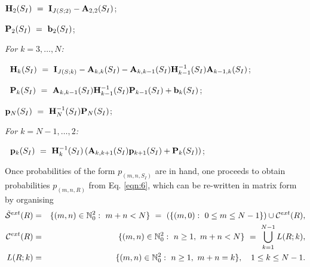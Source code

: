 \documentclass[10pt,A4paper]{article}
\begin{document}
\vspace{0.5cm}
\par {}
\begin{description}
  \item ${\bf H}_2(S_I) ~=~ {\bf I}_{J(S;2)}-{\bf A}_{2,2}(S_I)$;
  \item ${\bf P}_2(S_I) ~=~ {\bf b}_2(S_I)$;
  \item \it For $k=3,\dots,N$:
  \item $~$\hspace{0.5cm} ${\bf H}_k(S_I) ~=~ {\bf I}_{J(S;k)}-{\bf A}_{k,k}(S_I)-{\bf A}_{k,k-1}(S_I){\bf H}_{k-1}^{-1}(S_I){\bf A}_{k-1,k}(S_I)$;
  \item $~$\hspace{0.5cm} ${\bf P}_k(S_I) ~=~ {\bf A}_{k,k-1}(S_I){\bf H}_{k-1}^{-1}(S_I){\bf P}_{k-1}(S_I)+{\bf b}_k(S_I)$;
  \item ${\bf p}_N(S_I) ~=~ {\bf H}_N^{-1}(S_I){\bf P}_N(S_I)$;
  \item \it For $k=N-1,\dots,2$:
  \item $~$\hspace{0.5cm} ${\bf p}_k(S_I) ~=~ {\bf H}_k^{-1}(S_I)\left({\bf A}_{k,k+1}(S_I){\bf p}_{k+1}(S_I)+{\bf P}_k(S_I)\right)$;
\end{description}
\vspace{0.5cm}


\par Once probabilities of the form $p_{(m,n,S_I)}$ are in hand, one proceeds to obtain probabilities $p_{(m,n,R)}$ from Eq. \eqref{eqn:6}, which can be
re-written in matrix form by organising
\begin{eqnarray*}
 {\cal \tilde S}^{ext}(R) &=& \{(m,n)\in\mathbb{N}_0^2:\ m+n< N\} \ = \ \left(\{(m,0):\ 0\leq m\leq N-1\}\right)\cup{\cal C}^{ext}(R),\\
 {\cal C}^{ext}(R) &=& \{(m,n)\in\mathbb{N}_0^2:\ n\geq1,\ m+n< N\} \ = \ \bigcup\limits_{k=1}^{N-1} L(R;k),\\
 L(R;k) &=& \{(m,n)\in\mathbb{N}_0^2:\ n\geq1,\ m+n=k\},\quad 1\leq k\leq N-1.
\end{eqnarray*}
\end{document}

